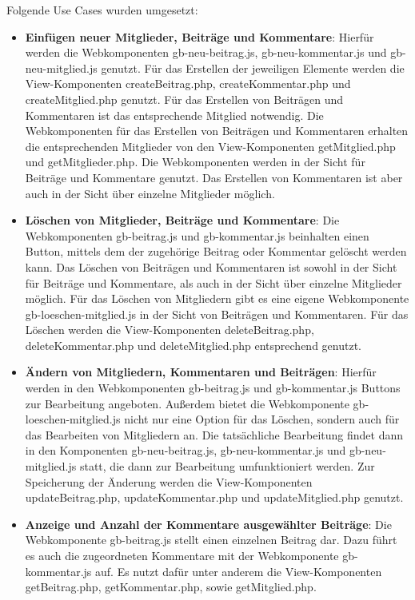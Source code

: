 Folgende Use Cases wurden umgesetzt:
\begin{itemize}
	\item \textbf{Einfügen neuer Mitglieder, Beiträge und Kommentare}: Hierfür werden die Webkomponenten \grqq gb-neu-beitrag.js\grqq{}, \grqq gb-neu-kommentar.js\grqq{} und \grqq gb-neu-mitglied.js\grqq{} genutzt. Für das Erstellen der jeweiligen Elemente werden die View-Komponenten \grqq createBeitrag.php\grqq{}, \grqq createKommentar.php\grqq{} und \grqq createMitglied.php\grqq{} genutzt. Für das Erstellen von Beiträgen und Kommentaren ist das entsprechende Mitglied notwendig. Die Webkomponenten für das Erstellen von Beiträgen und Kommentaren erhalten die entsprechenden Mitglieder von den View-Komponenten \grqq getMitglied.php\grqq{} und \grqq getMitglieder.php\grqq{}. Die Webkomponenten werden in der Sicht für Beiträge und Kommentare genutzt. Das Erstellen von Kommentaren ist aber auch in der Sicht über einzelne Mitglieder möglich.
	\item \textbf{Löschen von Mitglieder, Beiträge und Kommentare}: Die Webkomponenten \grqq gb-beitrag.js\grqq{} und \grqq gb-kommentar.js\grqq{} beinhalten einen Button, mittels dem der zugehörige Beitrag oder Kommentar gelöscht werden kann. Das Löschen von Beiträgen und Kommentaren ist sowohl in der Sicht für Beiträge und Kommentare, als auch in der Sicht über einzelne Mitglieder möglich. Für das Löschen von Mitgliedern gibt es eine eigene Webkomponente \grqq gb-loeschen-mitglied.js\grqq{} in der Sicht von Beiträgen und Kommentaren. Für das Löschen werden die View-Komponenten \grqq deleteBeitrag.php\grqq{}, \grqq deleteKommentar.php\grqq{} und \grqq deleteMitglied.php\grqq{} entsprechend genutzt.
	\item \textbf{Ändern von Mitgliedern, Kommentaren und Beiträgen}: Hierfür werden in den Webkomponenten \grqq gb-beitrag.js\grqq{} und \grqq gb-kommentar.js\grqq{} Buttons zur Bearbeitung angeboten. Außerdem bietet die Webkomponente \grqq gb-loeschen-mitglied.js\grqq{} nicht nur eine Option für das Löschen, sondern auch für das Bearbeiten von Mitgliedern an. Die tatsächliche Bearbeitung findet dann in den Komponenten \grqq gb-neu-beitrag.js\grqq{}, \grqq gb-neu-kommentar.js\grqq{} und \grqq gb-neu-mitglied.js\grqq{} statt, die dann zur Bearbeitung umfunktioniert werden. Zur Speicherung der Änderung werden die View-Komponenten \grqq updateBeitrag.php\grqq{}, \grqq updateKommentar.php\grqq{} und \grqq updateMitglied.php\grqq{} genutzt.
	\item \textbf{Anzeige und Anzahl der Kommentare ausgewählter Beiträge}: Die Webkomponente \grqq gb-beitrag.js\grqq{} stellt einen einzelnen Beitrag dar. Dazu führt es auch die zugeordneten Kommentare mit der Webkomponente \grqq gb-kommentar.js\grqq{} auf. Es nutzt dafür unter anderem die View-Komponenten \grqq getBeitrag.php\grqq{}, \grqq getKommentar.php\grqq{}, sowie \grqq getMitglied.php\grqq{}.

\end{itemize}
